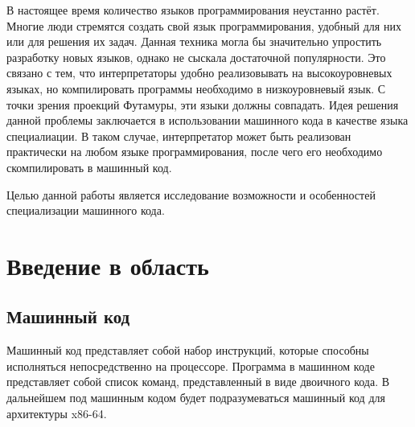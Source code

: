 В настоящее время количество языков программирования неустанно растёт. Многие люди стремятся создать свой язык программирования, удобный для них или для решения их задач. Данная техника могла бы значительно упростить разработку новых языков, однако не сыскала достаточной популярности. Это связано с тем, что интерпретаторы удобно реализовывать на высокоуровневых языках, но компилировать программы необходимо в низкоуровневый язык. С точки зрения проекций Футамуры, эти языки должны совпадать. Идея решения данной проблемы заключается в использовании машинного кода в качестве языка специалиации. В таком случае, интерпретатор может быть реализован практически на любом языке  программирования, после чего его необходимо скомпилировать в машинный код.

Целью данной работы является исследование возможности и особенностей специализации машинного кода.

\section{ Введение в область}
\subsection{ Машинный код}
Машинный код\cite{AMD} представляет собой набор инструкций, которые способны исполняться непосредственно на процессоре. Программа в машинном коде представляет собой список команд, представленный в виде двоичного кода. В дальнейшем под машинным кодом будет подразумеваться машинный код для архитектуры x86-64.

